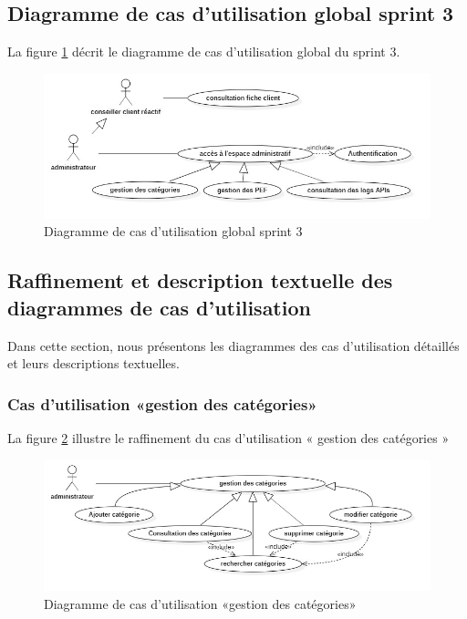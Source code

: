 \subsection{Diagramme de cas d’utilisation global sprint 3}
La figure \ref{fig:usecase-sprint3} décrit le diagramme de cas d’utilisation global du sprint 3.
\begin{figure}[H]
	\centering
	\includegraphics[width=0.58\linewidth]{"img/conception/usecases/sprint 3/UseCase-sprint3"}
	\caption[Diagramme de cas d’utilisation global sprint 3]{Diagramme de cas d’utilisation global sprint 3}
	\label{fig:usecase-sprint3}
\end{figure}

\subsection{Raffinement et description textuelle des diagrammes de cas d’utilisation}
Dans cette section, nous présentons les diagrammes des cas d’utilisation détaillés et leurs descriptions textuelles.\newpage
\subsubsection{Cas d’utilisation «gestion des catégories»}
La figure \ref{fig:usecase-gestion-categories} illustre le raffinement du cas d’utilisation « gestion des catégories »

\begin{figure}[H]
	\centering
	\includegraphics[width=0.7\linewidth]{"img/conception/usecases/sprint 3/usecase-gestion-categories"}
	\caption[Cas d’utilisation «gestion des catégories»]{Diagramme de cas d’utilisation «gestion des catégories»}
	\label{fig:usecase-gestion-categories}
\end{figure}

